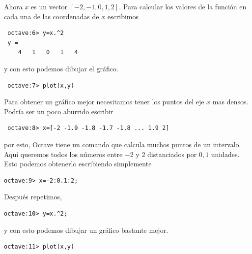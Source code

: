 Ahora $x$ es un vector $[-2, -1, 0, 1, 2]$. Para calcular los valores
de la función en cada una de las coordenadas de $x$ escribimos
\begin{octaveboxI}
  \begin{verbatim}
 octave:6> y=x.^2
 y =
    4   1   0   1   4
\end{verbatim}
\end{octaveboxI}
y con esto podemos dibujar el gráfico.
\begin{octaveboxI}
  \begin{verbatim}
 octave:7> plot(x,y)
\end{verbatim}
\end{octaveboxI}


Para obtener un gráfico mejor necesitamos tener los puntos del eje $x$
mas densos. Podría ser un poco aburrido  escribir 
\begin{octaveboxI}
{\footnotesize
  \begin{verbatim}
 octave:8> x=[-2 -1.9 -1.8 -1.7 -1.8 ... 1.9 2]
\end{verbatim}}
\end{octaveboxI}
por esto, Octave tiene un comando que calcula muchos puntos de un
intervalo. Aquí queremos todos los números entre $-2$ y $2$
distanciados por $0,1$ unidades. Esto podemos obtenerlo escribiendo
simplemente
\begin{octavebox}
\begin{verbatim}
octave:9> x=-2:0.1:2;
\end{verbatim}
\end{octavebox}
Después  repetimos,
\begin{octavebox}
\begin{verbatim}
octave:10> y=x.^2; 
\end{verbatim}
\end{octavebox}
y con esto podemos dibujar un gráfico bastante mejor.
\begin{octavebox}
  \begin{verbatim}
octave:11> plot(x,y)
\end{verbatim}
\end{octavebox}

\newpage

